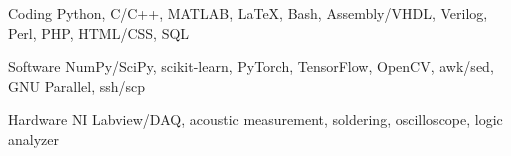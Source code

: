

\begin{cvskills}

  \cvskill
    {Coding} %
    {Python, C/C++, MATLAB\textregistered, LaTeX, Bash, Assembly/VHDL, Verilog, Perl, PHP, HTML/CSS, SQL} %

  \cvskill
    {Software} %
    {NumPy/SciPy, scikit-learn, PyTorch, TensorFlow, OpenCV, awk/sed, GNU Parallel, ssh/scp} %
    
  \cvskill
    {Hardware} %
    {NI Labview/DAQ, acoustic measurement, soldering, oscilloscope, logic analyzer} %

\end{cvskills}